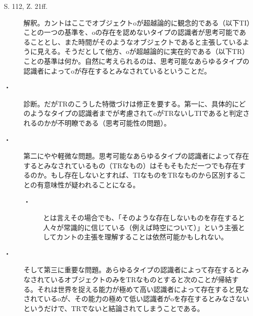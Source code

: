 \documentclass[12pt]{jsarticle}
\begin{document}
\begin{description}
\item[S. 112, Z. 21ff.]解釈。カントはここでオブジェクトoが超越論的に観念的である（以下TI）ことの一つの基準を、oの存在を認めないタイプの認識者が思考可能であることとし、また時間がそのようなオブジェクトであると主張しているように見える。そうだとして他方、oが超越論的に実在的である（以下TR）ことの基準は何か。自然に考えられるのは、思考可能なあらゆるタイプの認識者によってoが存在するとみなされているということだ。
\item[・]診断。だがTRのこうした特徴づけは修正を要する。第一に、具体的にどのようなタイプの認識者までが考慮されてoがTRないしTIであると判定されるのかが不明瞭である（思考可能性の問題）。
\item[・]第二にやや軽微な問題。思考可能なあらゆるタイプの認識者によって存在するとみなされているもの（TRなもの）はそもそもただ一つでも存在するのか。もし存在しないとすれば、TIなものをTRなものから区別することの有意味性が疑われることになる。
\begin{description}
\item[・]とは言えその場合でも、「そのような存在しないものを存在すると人々が常識的に信じている（例えば時空について）」という主張としてカントの主張を理解することは依然可能かもしれない。
\end{description}
\item[・]そして第三に重要な問題。あらゆるタイプの認識者によって存在するとみなされているオブジェクトのみをTRなものとすると次のことが帰結する。それは世界を捉える能力が極めて高い認識者によって存在すると見なされているoが、その能力の極めて低い認識者がoを存在するとみなさないというだけで、TRでないと結論されてしまうことである。
\end{description}
\end{document}
